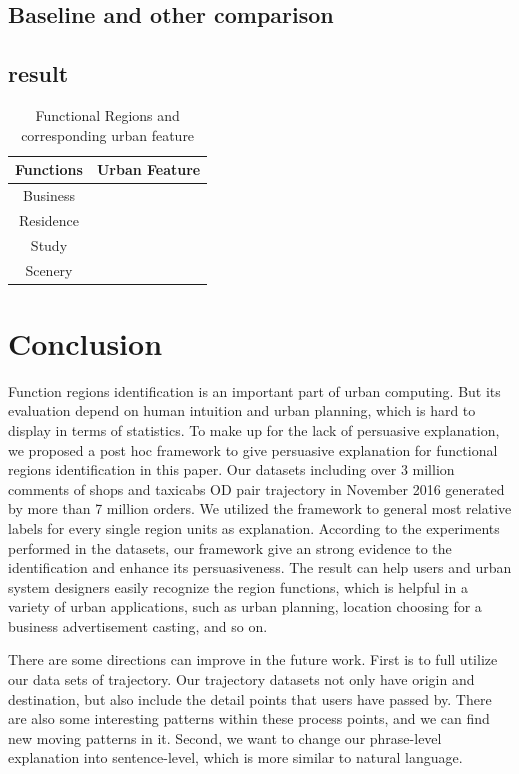 \documentclass[runningheads]{llncs}
\begin{document}
\subsection{Baseline and other comparison}

\subsection{result}
\begin{table}[h]
\centering
\caption{Functional Regions and corresponding urban feature}\label{dataset}
\begin{tabular}{c|c}
\hline
Functions & Urban Feature\\
\hline
Business & \\
\hline
Residence & \\
\hline
Study & \\
\hline
Scenery & \\
\hline
\end{tabular}
\end{table}

\section{Conclusion}
Function regions identification is an important part of urban computing.
But its evaluation depend on human intuition and urban planning, which is hard to display in terms of statistics.
To make up for the lack of persuasive explanation, we proposed a post hoc framework to give persuasive explanation for functional regions identification in this paper.
Our datasets including over 3 million comments of shops and taxicabs OD pair trajectory in November 2016 generated by more than 7 million orders.
We utilized the framework to general most relative labels for every single region units as explanation.
According to the experiments performed in the datasets, our framework give an strong evidence to the identification and enhance its persuasiveness.
The result can help users and urban system designers easily recognize the region functions, which is helpful in a variety of urban applications, such as urban planning, location choosing for a business advertisement casting, and so on.

There are some directions can improve in the future work.
First is to full utilize our data sets of trajectory. 
Our trajectory datasets not only have origin and destination, but also include the detail points that users have passed by.
There are also some interesting patterns within these process points, and we can find new moving patterns in it. 
Second, we want to change our phrase-level explanation into sentence-level, which is more similar to natural language.
\end{document}
